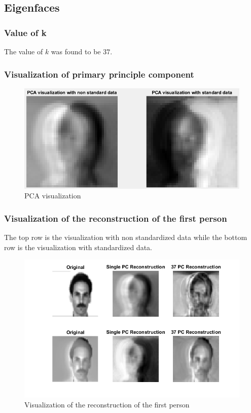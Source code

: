 \documentclass[12pt]{article}
\begin{document}
\newpage
\subsection{Eigenfaces}

\subsubsection{Value of k}
The value of $k$ was found to be $37$.
\subsubsection{Visualization of primary principle component}
\begin{center}
    
    \begin{figure}[h!]
        \includegraphics[scale=1.0]{Eigenfaces1.png}
        \caption{PCA visualization}
    \end{figure}
    
\end{center}
\newpage
\subsubsection{Visualization of the reconstruction of the first person}
The top row is the visualization with non standardized data while the bottom row is the visualization with standardized data.
\begin{figure}[h!]
    \begin{center}
        \includegraphics[scale=1.0]{Eigenfaces2.png}
        \caption{Visualization of the reconstruction of the first person}
    \end{center}
\end{figure}
\end{document}
